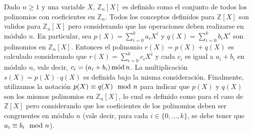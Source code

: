 Dado $n \geq 1$ y una variable $X$, $\mathbb{Z}_n[X]$ es definido como
el conjunto de todos los polinomios con coeficientes en $\mathbb{Z}_n$. Todos
los conceptos definidos para $\mathbb{Z}[X]$ son validos para
$\mathbb{Z}_n[X]$ pero considerando que las operaciones deben
realizarse en módulo $n$. En particular, sea $p(X) = \sum_{i=0}^k a_i
X^i$ y $q(X)= \sum_{i=0}^k b_i X^i$ son polinomios en
$\mathbb{Z}_n[X]$. Entonces el polinomio $r(X) = p(X) + q(X)$ es
calculado considerando que $r(X) = \sum_{i=0}^k c_i X^i$ y cada $c_i$
es igual a $a_i + b_i$ en módulo $n$, vale decir, $c_i = (a_i+b_i)
\mods n$. La multiplicación $s(X) = p(X) \cdot q(X)$ es definida bajo
la misma consideración. Finalmente, utilizamos la notación $p(X)
\equiv q(X) \modl n$ para indicar que $p(X)$ y $q(X)$ son los mismos
polinomios en $\mathbb{Z}_n[X]$, lo cual es definido como para el caso
de $\mathbb{Z}[X]$ pero considerando que los coeficientes de los
polinomios deben ser congruentes en módulo $n$ (vale decir, para cada
$i \in \{0, \ldots, k\}$, se debe tener que $a_i \equiv b_i \modl n$).

